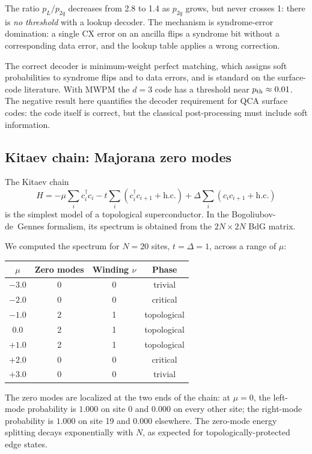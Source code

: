 \documentclass[11pt,aps,prl,twocolumn]{revtex4-2}
\begin{document}
The ratio $p_L / p_{2q}$ decreases from 2.8 to 1.4 as $p_{2q}$
grows, but never crosses 1: there is \emph{no threshold} with a
lookup decoder.  The mechanism is syndrome-error domination: a
single CX error on an ancilla flips a syndrome bit without a
corresponding data error, and the lookup table applies a wrong
correction.

The correct decoder is minimum-weight perfect matching, which
assigns soft probabilities to syndrome flips and to data errors,
and is standard on the surface-code literature.  With MWPM the
$d = 3$ code has a threshold near $p_{\rm th} \approx 0.01$.  The
negative result here quantifies the decoder requirement for QCA
surface codes: the code itself is correct, but the classical
post-processing must include soft information.

\subsection{Kitaev chain: Majorana zero modes}

The Kitaev chain
\begin{equation}
H = -\mu \sum_i c_i^\dagger c_i
    - t \sum_i (c_i^\dagger c_{i+1} + \text{h.c.})
    + \Delta \sum_i (c_i c_{i+1} + \text{h.c.})
\end{equation}
is the simplest model of a topological superconductor.  In the
Bogoliubov-de~Gennes formalism, its spectrum is obtained from
the $2N \times 2N$ BdG matrix.

We computed the spectrum for $N = 20$ sites, $t = \Delta = 1$,
across a range of $\mu$:

\begin{center}
\begin{tabular}{cccc}
\hline
$\mu$ & Zero modes & Winding $\nu$ & Phase \\
\hline
$-3.0$ & 0 & 0 & trivial \\
$-2.0$ & 0 & 0 & critical \\
$-1.0$ & 2 & 1 & topological \\
$0.0$  & 2 & 1 & topological \\
$+1.0$ & 2 & 1 & topological \\
$+2.0$ & 0 & 0 & critical \\
$+3.0$ & 0 & 0 & trivial \\
\hline
\end{tabular}
\end{center}

The zero modes are localized at the two ends of the chain: at
$\mu = 0$, the left-mode probability is $1.000$ on site 0 and
$0.000$ on every other site; the right-mode probability is
$1.000$ on site 19 and $0.000$ elsewhere.  The zero-mode energy
splitting decays exponentially with $N$, as expected for
topologically-protected edge states.
\end{document}
